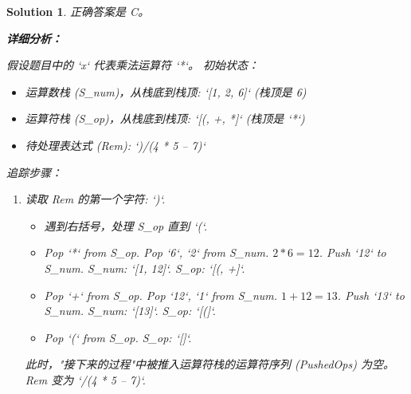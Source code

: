 \documentclass[UTF8]{report}
\newtheorem{solution}{Solution}
\theoremstyle{MyLineTheoremStyle} %
\theoremstyle{MyBlockTheoremStyle} %
\theoremstyle{MySubsubsectionStyle} %
\begin{document}
\begin{solution}
正确答案是 C。

\textbf{详细分析：}

假设题目中的 `x` 代表乘法运算符 `*`。
初始状态：
\begin{itemize}
    \item 运算数栈 (S\_num)，从栈底到栈顶: `[1, 2, 6]` (栈顶是 6)
    \item 运算符栈 (S\_op)，从栈底到栈顶: `[(, +, *]` (栈顶是 `*`)
    \item 待处理表达式 (Rem): `)/(4 * 5 – 7)`
\end{itemize}

追踪步骤：
\begin{enumerate}
    \item 读取 Rem 的第一个字符: `)`.
    \begin{itemize}
        \item 遇到右括号，处理 S\_op 直到 `(`.
        \item Pop `*` from S\_op. Pop `6`, `2` from S\_num. $2 * 6 = 12$. Push `12` to S\_num. S\_num: `[1, 12]`. S\_op: `[(, +]`.
        \item Pop `+` from S\_op. Pop `12`, `1` from S\_num. $1 + 12 = 13$. Push `13` to S\_num. S\_num: `[13]`. S\_op: `[(]`.
        \item Pop `(` from S\_op. S\_op: `[]`.
    \end{itemize}
    此时，"接下来的过程"中被推入运算符栈的运算符序列 (PushedOps) 为空。Rem 变为 `/(4 * 5 – 7)`.


\end{enumerate}
\end{solution}
\end{document}
